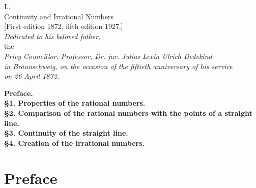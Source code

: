 \documentclass[11pt]{article}
\begin{document}
\begin{center}
{\Large L.}\\[0.4em]
{\LARGE Continuity and Irrational Numbers}\\[0.6em]
{[First edition 1872, fifth edition 1927.]}\\[2em]
{\itshape Dedicated to his beloved father,}\\[0.4em]
{the}\\[0.4em]
{\itshape Privy Councillor, Professor, Dr. jur. Julius Levin Ulrich Dedekind}\\[0.4em]
{\itshape in Braunschweig, on the occasion of the fiftieth anniversary of his service}\\[0.4em]
{\itshape on 26 April 1872.}
\end{center}

\bigskip

\noindent\textbf{Preface.}\\
\textbf{\S 1. Properties of the rational numbers.}\\
\textbf{\S 2. Comparison of the rational numbers with the points of a straight line.}\\
\textbf{\S 3. Continuity of the straight line.}\\
\textbf{\S 4. Creation of the irrational numbers.}

\section*{Preface}
\end{document}
